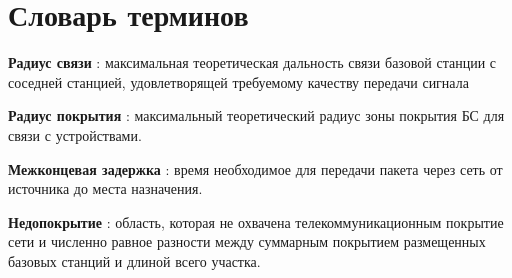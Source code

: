 \chapter*{Словарь терминов}             %


\textbf{Радиус связи} : максимальная теоретическая дальность связи базовой станции с соседней станцией, удовлетворящей требуемому качеству передачи сигнала

\textbf{Радиус покрытия} : максимальный теоретический радиус зоны покрытия БС для связи с устройствами.

\textbf{Межконцевая задержка} : время необходимое для передачи пакета через сеть от источника до места назначения.

\textbf{Недопокрытие} : область, которая не охвачена телекоммуникационным покрытие сети и численно равное разности между суммарным покрытием размещенных базовых станций и длиной всего участка.

